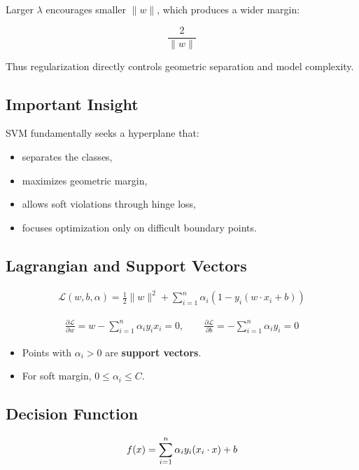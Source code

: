 \documentclass[10pt,a4paper]{article}
\begin{document}
		Larger $\lambda$ encourages smaller $\|w\|$, which produces a wider margin:
		
		\[
		\frac{2}{\|w\|}
		\]
		
		Thus regularization directly controls geometric separation and model complexity.
		
		\subsection{Important Insight}
		
		SVM fundamentally seeks a hyperplane that:
		
		\begin{itemize}
		    \item separates the classes,
		    \item maximizes geometric margin,
		    \item allows soft violations through hinge loss,
		    \item focuses optimization only on difficult boundary points.
		\end{itemize}
		
		
		
		
	
		\subsection{Lagrangian and Support Vectors}
		\begin{align*}
			\mathcal{L}(w,b,\alpha)=\frac{1}{2}\lVert w \rVert^2+\sum_{i=1}^n\alpha_i\left(1 - y_i (w \cdot x_i + b)\right)
		\end{align*}
	
		\begin{align*}
			\frac{\partial \mathcal{L}}{\partial w}=w - \sum_{i=1}^n \alpha_i y_i x_i = 0, \qquad
			\frac{\partial \mathcal{L}}{\partial b}=- \sum_{i=1}^n \alpha_i y_i = 0
		\end{align*}
	
		\begin{itemize}
			\item Points with $\alpha_i>0$ are \textbf{support vectors}.
			\item For soft margin, $0 \le \alpha_i \le C$.
		\end{itemize}
	
		\subsection{Decision Function}
		\begin{align*}
			\Large f(x)=\sum_{i=1}^n \alpha_i y_i (x_i \cdot x) + b
		\end{align*}
		
\end{document}
